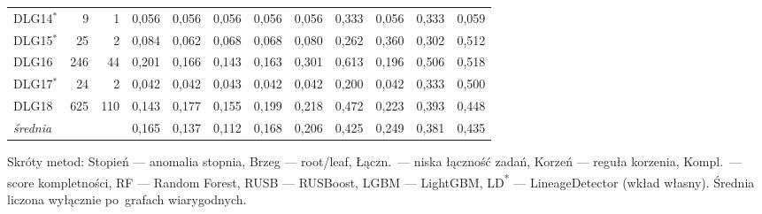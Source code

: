 \begin{table}[ht]
\begin{tabular}{lrrccccccccc}
DLG14$^{*}$ & 9 & 1 & 0{,}056 & 0{,}056 & 0{,}056 & 0{,}056 & 0{,}056 & 0{,}333 & 0{,}056 & 0{,}333 & 0{,}059 \\
DLG15$^{*}$ & 25 & 2 & 0{,}084 & 0{,}062 & 0{,}068 & 0{,}068 & 0{,}080 & 0{,}262 & 0{,}360 & 0{,}302 & 0{,}512 \\
DLG16 & 246 & 44 & 0{,}201 & 0{,}166 & 0{,}143 & 0{,}163 & 0{,}301 & 0{,}613 & 0{,}196 & 0{,}506 & 0{,}518 \\
DLG17$^{*}$ & 24 & 2 & 0{,}042 & 0{,}042 & 0{,}043 & 0{,}042 & 0{,}042 & 0{,}200 & 0{,}042 & 0{,}333 & 0{,}500 \\
DLG18 & 625 & 110 & 0{,}143 & 0{,}177 & 0{,}155 & 0{,}199 & 0{,}218 & 0{,}472 & 0{,}223 & 0{,}393 & 0{,}448 \\
\midrule
\emph{średnia} & & & 0{,}165 & 0{,}137 & 0{,}112 & 0{,}168 & 0{,}206 & 0{,}425 & 0{,}249 & 0{,}381 & 0{,}435 \\
\bottomrule
\end{tabular}

\vspace{0.4em}
\footnotesize Skróty metod: Stopień — anomalia stopnia, Brzeg — root/leaf, Łączn.\ — niska łączność zadań, Korzeń — reguła korzenia, Kompl.\ — score kompletności, RF — Random Forest, RUSB — RUSBoost, LGBM — LightGBM, LD\textsuperscript{*} — LineageDetector (wkład własny). Średnia liczona wyłącznie po~grafach wiarygodnych.
\end{table}

\clearpage

